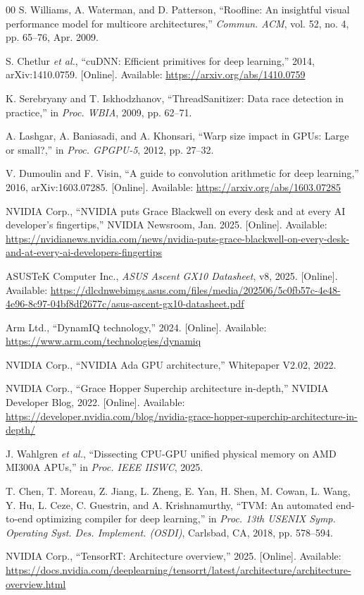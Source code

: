 \documentclass[conference]{IEEEtran}
\begin{document}
\begin{thebibliography}{00}
 S. Williams, A. Waterman, and D. Patterson, ``Roofline: An insightful visual performance model for multicore architectures,'' \emph{Commun. ACM}, vol. 52, no. 4, pp. 65--76, Apr. 2009.

 S. Chetlur \emph{et al.}, ``cuDNN: Efficient primitives for deep learning,'' 2014, arXiv:1410.0759. [Online]. Available: \url{https://arxiv.org/abs/1410.0759}

 K. Serebryany and T. Iskhodzhanov, ``ThreadSanitizer: Data race detection in practice,'' in \emph{Proc. WBIA}, 2009, pp. 62--71.

 A. Lashgar, A. Baniasadi, and A. Khonsari, ``Warp size impact in GPUs: Large or small?,'' in \emph{Proc. GPGPU-5}, 2012, pp. 27--32.

 V. Dumoulin and F. Visin, ``A guide to convolution arithmetic for deep learning,'' 2016, arXiv:1603.07285. [Online]. Available: \url{https://arxiv.org/abs/1603.07285}

 NVIDIA Corp., ``NVIDIA puts Grace Blackwell on every desk and at every AI developer's fingertips,'' NVIDIA Newsroom, Jan. 2025. [Online]. Available: \url{https://nvidianews.nvidia.com/news/nvidia-puts-grace-blackwell-on-every-desk-and-at-every-ai-developers-fingertips}

 ASUSTeK Computer Inc., \emph{ASUS Ascent GX10 Datasheet}, v8, 2025. [Online]. Available: \url{https://dlcdnwebimgs.asus.com/files/media/202506/5c0fb57c-4e48-4e96-8c97-04bf8df2677c/asus-ascent-gx10-datasheet.pdf}

 Arm Ltd., ``DynamIQ technology,'' 2024. [Online]. Available: \url{https://www.arm.com/technologies/dynamiq}

 NVIDIA Corp., ``NVIDIA Ada GPU architecture,'' Whitepaper V2.02, 2022.

 NVIDIA Corp., ``Grace Hopper Superchip architecture in-depth,'' NVIDIA Developer Blog, 2022. [Online]. Available: \url{https://developer.nvidia.com/blog/nvidia-grace-hopper-superchip-architecture-in-depth/}

 J. Wahlgren \emph{et al.}, ``Dissecting CPU-GPU unified physical memory on AMD MI300A APUs,'' in \emph{Proc. IEEE IISWC}, 2025.

 T. Chen, T. Moreau, Z. Jiang, L. Zheng, E. Yan, H. Shen, M. Cowan, L. Wang, Y. Hu, L. Ceze, C. Guestrin, and A. Krishnamurthy, ``TVM: An automated end-to-end optimizing compiler for deep learning,'' in \emph{Proc. 13th USENIX Symp. Operating Syst. Des. Implement. (OSDI)}, Carlsbad, CA, 2018, pp. 578--594.

 NVIDIA Corp., ``TensorRT: Architecture overview,'' 2025. [Online]. Available: \url{https://docs.nvidia.com/deeplearning/tensorrt/latest/architecture/architecture-overview.html}

\end{thebibliography}
\end{document}
